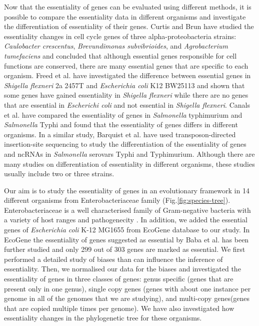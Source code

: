 \documentclass[12pt,letterpaper]{article}
\begin{document}
Now that the essentiality of genes can be evaluated using different methods, it is possible to compare the essentiality data in different organisms and investigate the differentiation of essentiality of their genes. Curtis and Brun \cite{curtis_identification_2014} have studied the essentiality changes in cell cycle genes of three alpha-proteobacteria strains: \textit{Caulobacter crescentus}, \textit{Brevundimonas subvibrioides}, and \textit{Agrobacterium tumefaciens} and concluded that although essential genes responsible for cell functions are conserved, there are many essential genes that are specific to each organism. Freed et al.\@ \cite{freed_combining_2016} have investigated the difference between essential genes in \textit{Shigella flexneri} 2a 2457T and \textit{Escherichia coli} K12 BW25113 and shown that some genes have gained essentiality in \textit{Shigella flexneri} while there are no genes that are essential in \textit{Escherichi coli} and not essential in \textit{Shigella flexneri}. Canals et al.\@ \cite{canals_high-throughput_2012} have compared the essentiality of genes in \textit{Salmonella} typhimurium and \textit{Salmonella} Typhi and found that the essentiality of genes differs in different organisms. In a similar study, Barquist et al.\@ \cite{barquist_comparison_2013} have used transposon-directed insertion-site sequencing to study the differentiation of the essentiality of genes and ncRNAs in \textit{Salmonella} serovars Typhi and Typhimurium. Although there are many studies on differentiation of essentiality in different organisms, these studies usually include two or three strains.

Our aim is to study the essentiality of genes in an evolutionary framework in 14 different organisms from Enterobacteriaceae family (Fig.\@ \ref{fig:species-tree}). Enterobacteriaceae is a well characterised family of Gram-negative bacteria with a variety of host ranges and pathogenecity \cite{brenner_bergeys_2006}. In addition, we added the essential genes of \textit{Escherichia coli} K-12 MG1655 from EcoGene database \cite{zhou_ecogene_2013} to our study. In EcoGene the essentiality of genes suggested as essential by Baba et al.\@ \cite{baba_construction_2006} has been further studied and only 299 out of 303 genes are marked as essential. We first performed a detailed study of biases than can influence the inference of essentiality. Then, we normalised our data for the biases and investigated the essentiality of genes in three classes of genes: genus specific (genes that are present only in one genus), single copy genes (genes with about one instance per genome in all of the genomes that we are studying), and multi-copy genes(genes that are copied multiple times per genome). We have also investigated how essentiality changes in the phylogenetic tree for these organisms.
\end{document}
